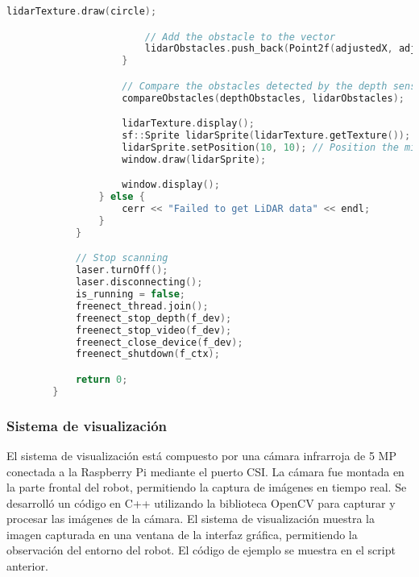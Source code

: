 \begin{lstlisting}[language={C++}, caption={C\'odigo de ejemplo de Kinect y LiDAR}, label={Script}]
                        lidarTexture.draw(circle);

                        // Add the obstacle to the vector
                        lidarObstacles.push_back(Point2f(adjustedX, adjustedY));
                    }

                    // Compare the obstacles detected by the depth sensor and LiDAR
                    compareObstacles(depthObstacles, lidarObstacles);

                    lidarTexture.display();
                    sf::Sprite lidarSprite(lidarTexture.getTexture());
                    lidarSprite.setPosition(10, 10); // Position the minimap at the top-left corner
                    window.draw(lidarSprite);

                    window.display();
                } else {
                    cerr << "Failed to get LiDAR data" << endl;
                }
            }

            // Stop scanning
            laser.turnOff();
            laser.disconnecting();
            is_running = false;
            freenect_thread.join();
            freenect_stop_depth(f_dev);
            freenect_stop_video(f_dev);
            freenect_close_device(f_dev);
            freenect_shutdown(f_ctx);

            return 0;
        }

    \end{lstlisting}

    \subsubsection{Sistema de visualizaci\'on}
    El sistema de visualizaci\'on est\'a compuesto por una c\'amara infrarroja de 5 MP
        conectada a la Raspberry Pi mediante el puerto CSI. La c\'amara fue montada en la parte
        frontal del robot, permitiendo la captura de im\'agenes en tiempo real.
    \vskip 0.5cm
    Se desarroll\'o un c\'odigo en C++ utilizando la biblioteca OpenCV para capturar y
        procesar las im\'agenes de la c\'amara. El sistema de visualizaci\'on muestra la imagen
        capturada en una ventana de la interfaz gr\'afica, permitiendo la observaci\'on del entorno
        del robot. El c\'odigo de ejemplo se muestra en el script anterior.
    \vskip 0.5cm
